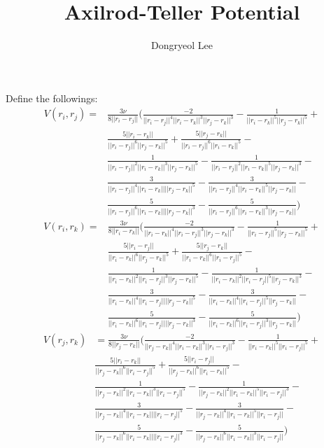 \documentclass[letterpaper,12pt]{article}
\author{Dongryeol Lee}
\title{Axilrod-Teller Potential}
\begin{document}
\maketitle

Define the followings:
\begin{align*}
V(r_i, r_j) =& \frac{3 \nu}{8 ||r_i - r_j||} \Biggl( \frac{-2}{||r_i -
r_j||^4 ||r_i - r_k||^3 ||r_j - r_k||^3} - \frac{1}{||r_i - r_k||^5
||r_j - r_k||^5} + \\ & \frac{5||r_i - r_k||}{||r_i - r_j||^6 ||r_j -
r_k||^5} + \frac{5||r_j - r_k||}{||r_i - r_j||^6 ||r_i - r_k||^5} -\\
& \frac{1}{||r_i - r_j||^2 ||r_i - r_k||^3 ||r_j - r_k||^5} -
 \frac{1}{||r_i - r_j||^2 ||r_i - r_k||^5 ||r_j - r_k||^3} -\\
& \frac{3}{||r_i - r_j||^4 ||r_i - r_k|| ||r_j - r_k||^5} -
 \frac{3}{||r_i - r_j||^4 ||r_i - r_k||^5 ||r_j - r_k||} -\\
& \frac{5}{||r_i - r_j||^6 ||r_i - r_k|| ||r_j - r_k||^3} -
\frac{5}{||r_i - r_j||^6 ||r_i - r_k||^3 ||r_j - r_k||}
 \Biggr )
\end{align*}
\begin{align*}
V(r_i, r_k) =& \frac{3 \nu}{8 ||r_i - r_k||} \Biggl( \frac{-2}{||r_i -
r_k||^4 ||r_i - r_j||^3 ||r_j - r_k||^3} - \frac{1}{||r_i - r_j||^5
||r_j - r_k||^5} + \\ & \frac{5||r_i - r_j||}{||r_i - r_k||^6 ||r_j -
r_k||^5} + \frac{5||r_j - r_k||}{||r_i - r_k||^6 ||r_i - r_j||^5} -\\
& \frac{1}{||r_i - r_k||^2 ||r_i - r_j||^3 ||r_j - r_k||^5} -
 \frac{1}{||r_i - r_k||^2 ||r_i - r_j||^5 ||r_j - r_k||^3} -\\
& \frac{3}{||r_i - r_k||^4 ||r_i - r_j|| ||r_j - r_k||^5} -
 \frac{3}{||r_i - r_k||^4 ||r_i - r_j||^5 ||r_j - r_k||} -\\
& \frac{5}{||r_i - r_k||^6 ||r_i - r_j|| ||r_j - r_k||^3} -
\frac{5}{||r_i - r_k||^6 ||r_i - r_j||^3 ||r_j - r_k||}
 \Biggr )
\end{align*}
\begin{align*}
V(r_j, r_k) &= \frac{3 \nu}{8 ||r_j - r_k||} \Biggl( \frac{-2}{||r_j -
r_k||^4 ||r_i - r_k||^3 ||r_i - r_j||^3} - \frac{1}{||r_i - r_k||^5
||r_i - r_j||^5} + \\ & \frac{5||r_i - r_k||}{||r_j - r_k||^6 ||r_i -
r_j||^5} + \frac{5||r_i - r_j||}{||r_j - r_k||^6 ||r_i - r_k||^5} -\\
& \frac{1}{||r_j - r_k||^2 ||r_i - r_k||^3 ||r_i - r_j||^5} -
 \frac{1}{||r_j - r_k||^2 ||r_i - r_k||^5 ||r_i - r_j||^3} -\\
& \frac{3}{||r_j - r_k||^4 ||r_i - r_k|| ||r_i - r_j||^5} -
 \frac{3}{||r_j - r_k||^4 ||r_i - r_k||^5 ||r_i - r_j||} -\\
& \frac{5}{||r_j - r_k||^6 ||r_i - r_k|| ||r_i - r_j||^3} -
\frac{5}{||r_j - r_k||^6 ||r_i - r_k||^3 ||r_i - r_j||}
 \Biggr )
\end{align*}
\end{document}
